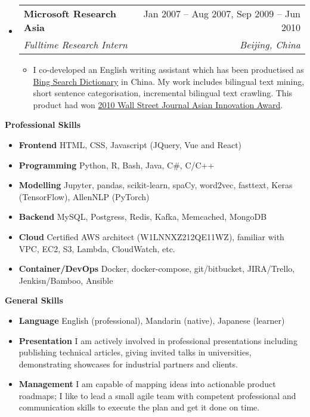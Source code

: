 \documentclass[letterpaper,12pt]{article}[leftmargin=*]
\makeatletter
\def \entryspacing {-0pt}
\renewcommand{\section}[2]{\vspace{5pt}
  \colorbox{secondary}{\color{white}\raggedbottom\normalsize\textbf{{#1}{\hspace{7pt}#2}}}
}
\newcommand{\resumeEntryStart}{\begin{itemize}[leftmargin=2.5mm]}
\newcommand{\resumeEntryEnd}{\end{itemize}\vspace{\entryspacing}}
\newcommand{\resumeItemListStart}{\begin{itemize}[leftmargin=4.5mm]}
\newcommand{\resumeItemListEnd}{\end{itemize}}
\newcommand{\resumeItem}[1]{
  \item\small{
    {#1 \vspace{-2pt}}
  }
}
\newcommand{\resumeEntryTSDL}[4]{
  \vspace{-1pt}\item[]
    \begin{tabularx}{0.97\textwidth}{X@{\hspace{60pt}}r}
      \textbf{\color{primary}#1} & {\firabook\color{accent}\small#2} \\
      \textit{\color{accent}\small#3} & \textit{\color{accent}\small#4} \\
    \end{tabularx}\vspace{-6pt}
}
\newcommand{\resumeEntryS}[2]{
  \item[]\small{
    \textbf{\color{primary}#1 }{ #2 \vspace{-6pt}}
  }
}
\makeatother
\begin{document}
  \resumeEntryStart
    \resumeEntryTSDL
      {Microsoft Research Asia}{Jan 2007 -- Aug 2007, Sep 2009 -- Jun 2010}
      {Fulltime Research Intern}{Beijing, China}
    \resumeItemListStart
      \resumeItem {I co-developed an English writing assistant which has been productised as \href{https://www.bing.com/dict?FORM=Z9LH3}{Bing Search Dictionary} in China. My work includes bilingual text mining, short sentence categorisation, incremental bilingual text crawling. This product had won \href{https://www.wsj.com/articles/SB10001424052748703545604575406771145298614}{2010 Wall Street Journal Asian Innovation Award}.}
    \resumeItemListEnd
  \resumeEntryEnd

\section{\faGears}{Professional Skills}
 \resumeEntryStart
  \resumeEntryS{Frontend} {HTML, CSS, Javascript (JQuery, Vue and React)}
  \resumeEntryS{Programming} {Python, R, Bash, Java, C\#, C/C++}
  \resumeEntryS{Modelling} {Jupyter, pandas, scikit-learn, spaCy, word2vec, fasttext, Keras (TensorFlow), AllenNLP (PyTorch)}
  \resumeEntryS{Backend} {MySQL, Postgress, Redis, Kafka, Memcached, MongoDB}
  \resumeEntryS{Cloud} {Certified AWS architect (W1LNNXZ212QE11WZ), familiar with VPC, EC2, S3, Lambda, CloudWatch, etc.}
  \resumeEntryS{Container/DevOps} {Docker, docker-compose, git/bitbucket, JIRA/Trello, Jenkisn/Bamboo, Ansible}
 \resumeEntryEnd

\section{\faGears}{General Skills}
 \resumeEntryStart
  \resumeEntryS{Language} {English (professional), Mandarin (native), Japanese (learner)}
  \resumeEntryS{Presentation} {I am actively involved in professional presentations including publishing technical articles, giving
invited talks in universities, demonstrating showcases for industrial partners and clients.}
  \resumeEntryS{Management} {I am capable of mapping ideas into actionable product roadmaps; I like to lead a small agile team with competent professional and communication skills to execute the plan and get it done on time.}
 \resumeEntryEnd

\end{document}
